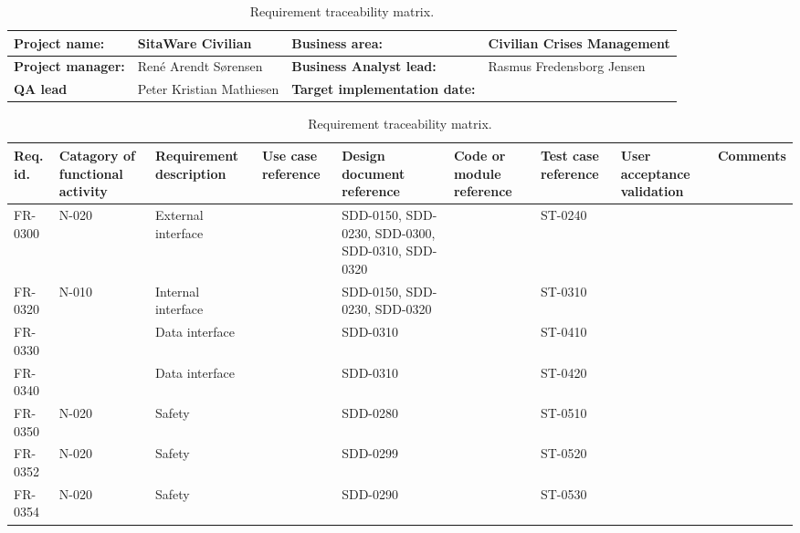 \begin{sidewaystable}
\begin{table}[H]
\begin{tabular}{|l|l|l|l|}
\hline
 \textbf{Project name:} & SitaWare Civilian & \textbf{Business area:}  & Civilian Crises Management\\ \hline
 \textbf{Project manager:} & René Arendt Sørensen & \textbf{Business Analyst lead:} & Rasmus Fredensborg  Jensen\\ \hline
 \textbf{QA lead} & Peter Kristian Mathiesen & \textbf{Target implementation date:}  & \\ \hline
\end{tabular}	
\begin{tabular}{|p{2cm}|p{2cm}|p{3cm}|p{2cm}|p{2cm}|p{2cm}|p{2cm}|p{2cm}|p{2cm}|}
\hline
 Req. id. & Catagory of functional activity & Requirement description  & Use case reference & Design document reference & Code or module reference & Test case reference & User acceptance validation & Comments\\ \hline
 FR-0300 & N-020 & External interface & &SDD-0150, SDD-0230, SDD-0300, SDD-0310, SDD-0320& & ST-0240 & &\\ \hline
 FR-0320 & N-010 & Internal interface & &SDD-0150, SDD-0230, SDD-0320& & ST-0310 & &\\ \hline
 FR-0330 & & Data interface & &SDD-0310 & & ST-0410 & &\\ \hline
 FR-0340 & & Data interface & &SDD-0310 & & ST-0420 & &\\ \hline
 FR-0350 & N-020 & Safety & &SDD-0280 & & ST-0510 & &\\ \hline
 FR-0352 & N-020 & Safety & &SDD-0299 & & ST-0520 & &\\ \hline 
 FR-0354 & N-020 & Safety & &SDD-0290 & & ST-0530 & &\\ \hline

 
\end{tabular}	
\caption{Requirement traceability matrix.}
\end{table}

\end{sidewaystable}







